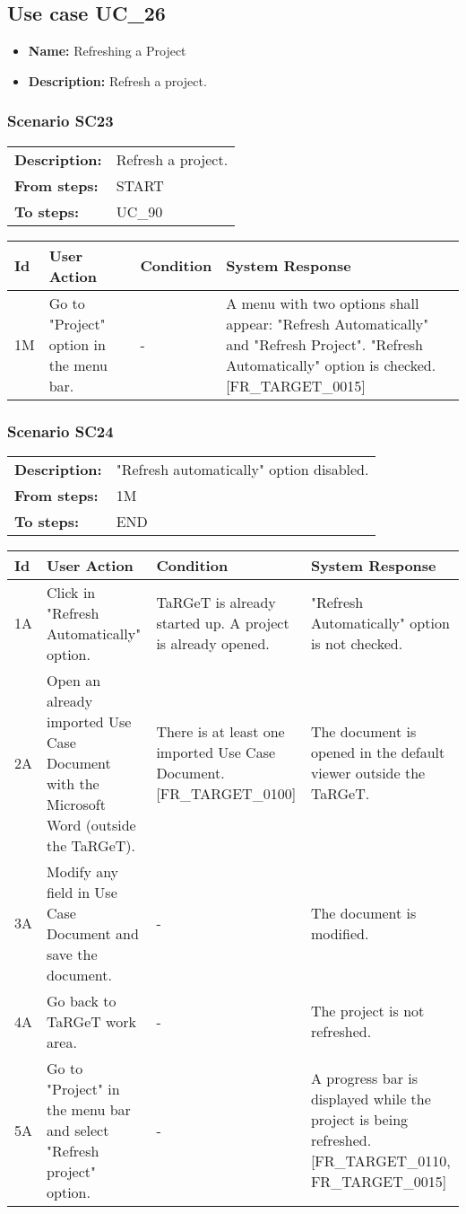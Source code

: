 \documentclass[a4paper,11pt]{article}
\newcommand{\bl}{\\ \hline}
\begin{document}
\subsection*{Use case UC_26}
\begin{itemize}
\item {\bf Name: }Refreshing a Project
\item {\bf Description: }Refresh a project.
\end{itemize}
\subsubsection*{Scenario SC23}
\begin{tabular}{p{1in}p{4in}}
{\bf Description:} & Refresh a project. \\
{\bf From steps:} & START \\
{\bf To steps:} & UC_90#1M \\
\end{tabular}
 
\begin{tabular}{|p{0.8in}|p{1.6in}|p{1.6in}|p{1.6in}|}
\hline
Id & User Action & Condition & System Response  \bl 
1M & Go to "Project" option in the menu bar.   & - &  A menu with two options shall appear: "Refresh
						Automatically" and "Refresh Project". "Refresh Automatically"
						option is checked. [FR_TARGET_0015] \bl 
\end{tabular}
\subsubsection*{Scenario SC24}
\begin{tabular}{p{1in}p{4in}}
{\bf Description:} & "Refresh automatically" option disabled. \\
{\bf From steps:} & 1M \\
{\bf To steps:} & END \\
\end{tabular}
 
\begin{tabular}{|p{0.8in}|p{1.6in}|p{1.6in}|p{1.6in}|}
\hline
Id & User Action & Condition & System Response  \bl 
1A & Click in "Refresh Automatically" option. & TaRGeT is already started up. A project is already
						opened.  & "Refresh Automatically" option is not checked. \bl 
2A & Open an already imported Use Case Document with the
						Microsoft Word (outside the TaRGeT). & There is at least one imported Use Case Document.
						[FR_TARGET_0100]  & The document is opened in the default viewer outside the
						TaRGeT. \bl 
3A & Modify any field in Use Case Document and save the
						document. & - & The document is modified.  \bl 
4A & Go back to TaRGeT work area. & - & The project is not refreshed. \bl 
5A & Go to "Project" in the menu bar and select "Refresh
						project" option. & - & A progress bar is displayed while the project is being
						refreshed. [FR_TARGET_0110, FR_TARGET_0015] \bl 
\end{tabular}
\end{document}
